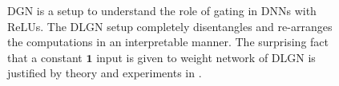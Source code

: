 \begin{comment}
\begin{figure}
\resizebox{.95\columnwidth}{!}{

}
\caption{Illustration of the dual `path-by-path' view of computations.}
\label{fig:paths}
\end{figure}
\end{comment}
\begin{figure}[!t]
\centering
\begin{minipage}{1.0\columnwidth}
\centering
\begin{minipage}{0.49\columnwidth}
\centering

\resizebox{0.8\columnwidth}{!}{

}
\end{minipage}
\begin{minipage}{0.49\columnwidth}
\centering

\resizebox{0.8\columnwidth}{!}{

}
\end{minipage}

\end{minipage}
\caption{\small{DGN is a setup to understand the role of gating in DNNs with ReLUs. The DLGN setup completely disentangles and re-arranges the computations in an interpretable manner. The surprising fact that a constant $\mathbf{1}$ input is given to weight network of DLGN is justified by theory and experiments in .}}
\label{fig:lgln}
\end{figure}


